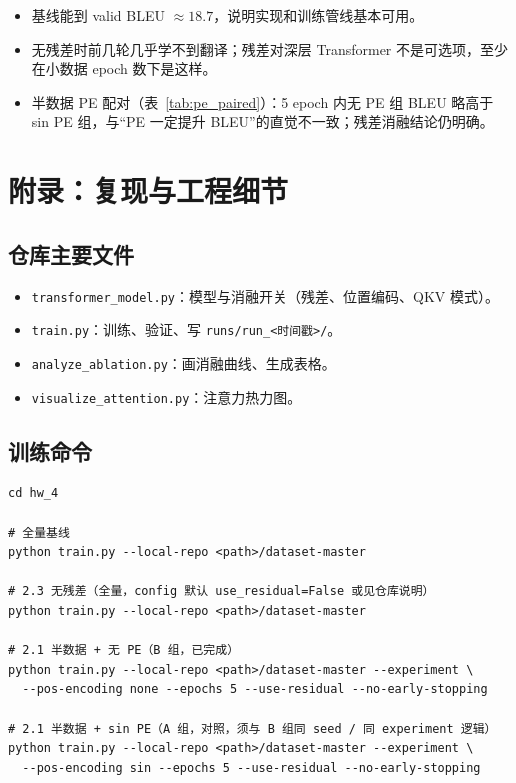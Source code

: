 \documentclass[UTF8,a4paper,11pt]{ctexart}
\begin{document}
\begin{itemize}
  \item 基线能到 valid BLEU $\approx 18.7$，说明实现和训练管线基本可用。
  \item 无残差时前几轮几乎学不到翻译；残差对深层 Transformer 不是可选项，至少在小数据 epoch 数下是这样。
  \item 半数据 PE 配对（表~\ref{tab:pe_paired}）：5 epoch 内无 PE 组 BLEU 略高于 sin PE 组，与“PE 一定提升 BLEU”的直觉不一致；残差消融结论仍明确。
\end{itemize}

\section{附录：复现与工程细节}

\subsection{仓库主要文件}

\begin{itemize}
  \item \texttt{transformer\_model.py}：模型与消融开关（残差、位置编码、QKV 模式）。
  \item \texttt{train.py}：训练、验证、写 \texttt{runs/run\_<时间戳>/}。
  \item \texttt{analyze\_ablation.py}：画消融曲线、生成表格。
  \item \texttt{visualize\_attention.py}：注意力热力图。
\end{itemize}

\subsection{训练命令}

\begin{verbatim}
cd hw_4

# 全量基线
python train.py --local-repo <path>/dataset-master

# 2.3 无残差（全量，config 默认 use_residual=False 或见仓库说明）
python train.py --local-repo <path>/dataset-master

# 2.1 半数据 + 无 PE（B 组，已完成）
python train.py --local-repo <path>/dataset-master --experiment \
  --pos-encoding none --epochs 5 --use-residual --no-early-stopping

# 2.1 半数据 + sin PE（A 组，对照，须与 B 组同 seed / 同 experiment 逻辑）
python train.py --local-repo <path>/dataset-master --experiment \
  --pos-encoding sin --epochs 5 --use-residual --no-early-stopping
\end{verbatim}
\end{document}
